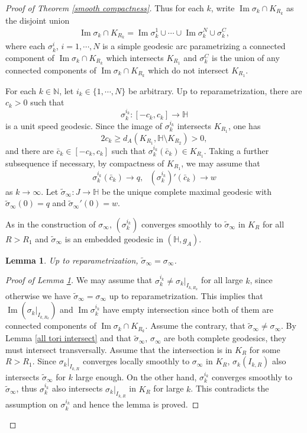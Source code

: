 \documentclass[12pt]{amsart}
\numberwithin{equation}{section}
\newtheorem{lem}[thm]{Lemma}
\theoremstyle{remark}
\begin{document}
\begin{proof} [Proof of Theorem \ref{smooth compactness}]
		Thus for each $k$, write $\operatorname{Im}\sigma_k \cap K_{R_k}$ as the disjoint union
		\begin{align} \label{splitting sigma_k into N components}
			\operatorname{Im}\sigma_k \cap K_{R_k} = \operatorname{Im}\sigma^1_k \cup \cdots\cup \operatorname{Im}\sigma^N_k \cup \sigma_k^C,
		\end{align}
		where each $\sigma^i_k$, $i=1, \cdots, N$ is a simple geodesic arc parametrizing a connected component of $\operatorname{Im} \sigma_k \cap K_{R_k}$ which intersects $K_{R_1}$ and $\sigma_k^C$ is the union of any connected components of $\operatorname{Im} \sigma_k \cap K_{R_k}$ which do not intersect $K_{R_1}$. 
		
		For each $k\in \mathbb N$, let $i_k \in \{1, \cdots, N\}$ be arbitrary. Up to reparametrization, there are $c_k>0$ such that
		$$\sigma^{i_k}_k : [-c_k, c_k] \to \mathbb H$$ 
		is a unit speed geodesic. Since the image of $\sigma^{i_k}_k$ intersects $K_{R_1}$, one has 
		$$2c_k \ge d_A(K_{R_1}, \mathbb H \setminus K_{R_2}) >0,$$ 
		and there are  $\bar c_k \in [-c_k, c_k]$ such that $\sigma^{i_k}_k(\bar c_k) \in K_{R_1}$. 
		Taking a further subsequence if necessary, by compactness of $K_{R_1}$, we may assume that 
		$$\sigma^{i_k}_k(\bar c_k) \to q, \ \ \ (\sigma^{i_k}_k)'(\bar c_k) \to w$$ 
		as $k\to \infty$. Let $\tilde \sigma_\infty : J \to \mathbb H$ be the unique complete maximal geodesic with $ \tilde \sigma_\infty (0) = q$ and $\tilde\sigma_\infty'(0)=w$. 
		
		As in the construction of $\sigma_\infty$, $(\sigma^{i_k}_k)$ converges smoothly to $\tilde\sigma_\infty$ in $K_R$ for all $R>R_1$ and $\tilde\sigma_\infty$ is an embedded geodesic in $(\mathbb H, g_A)$. 
		
		\begin{lem} \label{claim 2}
			Up to reparametrization, $\tilde\sigma_\infty = \sigma_\infty$. 
		\end{lem}
		
		\begin{proof} [Proof of Lemma \ref{claim 2}] We may assume that $\sigma^{i_k}_k \neq \sigma_k |_{I_{k, R_k}}$ for all large $k$, since otherwise we have $\tilde\sigma_\infty =\sigma_\infty$ up to reparametrization. This implies that $\operatorname{Im}(\sigma_k|_{I_{k,R_k}})$ and $\operatorname{Im}\sigma_k^{i_k}$ have empty intersection since both of them are connected components of $\operatorname{Im} \sigma_k \cap K_{R_k}$. Assume the contrary, that $\tilde\sigma_\infty \neq \sigma_\infty$. By Lemma \ref{all tori intersect} and that $\tilde\sigma_\infty$, $\sigma_\infty$ are both complete geodesics, they must intersect transversally. Assume that the intersection is in $K_R$ for some $R>R_1$. Since $\sigma_k |_{I_{k, R}}$ converges locally smoothly to $\sigma_\infty$ in $K_{R}$, $\sigma_{k} (I_{k, R})$ also intersects $\tilde\sigma_\infty$ for $k$ large enough. On the other hand, $\sigma^{i_k}_k$ converges smoothly to $\tilde\sigma_\infty$, thus $\sigma^{i_k}_k$ also intersects $\sigma_k |_{I_{k, R}}$ in $K_R$ for large $k$. This contradicts the assumption on $\sigma^{i_k}_k$ and hence the lemma is proved. 
		\end{proof}
		

\end{proof}
\end{document}
